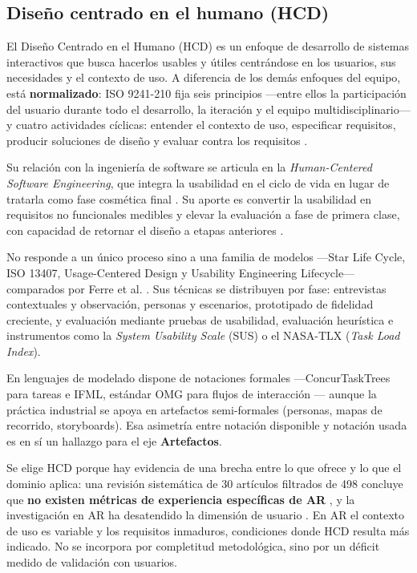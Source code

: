 \documentclass[conference]{IEEEtran}
\begin{document}
\subsection{Diseño centrado en el humano (HCD)}

El Diseño Centrado en el Humano (HCD) es un enfoque de desarrollo de sistemas interactivos que busca hacerlos usables y útiles centrándose en los usuarios, sus necesidades y el contexto de uso. A diferencia de los demás enfoques del equipo, está \textbf{normalizado}: ISO 9241-210 fija seis principios —entre ellos la participación del usuario durante todo el desarrollo, la iteración y el equipo multidisciplinario— y cuatro actividades cíclicas: entender el contexto de uso, especificar requisitos, producir soluciones de diseño y evaluar contra los requisitos \cite{ISO9241210}.

Su relación con la ingeniería de software se articula en la \textit{Human-Centered Software Engineering}, que integra la usabilidad en el ciclo de vida en lugar de tratarla como fase cosmética final \cite{Seffah2005}. Su aporte es convertir la usabilidad en requisitos no funcionales medibles y elevar la evaluación a fase de primera clase, con capacidad de retornar el diseño a etapas anteriores \cite{Ferre2005}.

No responde a un único proceso sino a una familia de modelos —Star Life Cycle, ISO 13407, Usage-Centered Design y Usability Engineering Lifecycle— comparados por Ferre et al. \cite{Ferre2005}. Sus técnicas se distribuyen por fase: entrevistas contextuales y observación, personas y escenarios, prototipado de fidelidad creciente, y evaluación mediante pruebas de usabilidad, evaluación heurística \cite{Nielsen1994} e instrumentos como la \textit{System Usability Scale} (SUS) o el NASA-TLX (\textit{Task Load Index}).

En lenguajes de modelado dispone de notaciones formales —ConcurTaskTrees para tareas \cite{Paterno2000} e IFML, estándar OMG para flujos de interacción \cite{OMG-IFML}— aunque la práctica industrial se apoya en artefactos semi-formales (personas, mapas de recorrido, storyboards). Esa asimetría entre notación disponible y notación usada es en sí un hallazgo para el eje \textbf{Artefactos}.

Se elige HCD porque hay evidencia de una brecha entre lo que ofrece y lo que el dominio aplica: una revisión sistemática de 30 artículos filtrados de 498 concluye que \textbf{no existen métricas de experiencia específicas de AR} \cite{Graser2024}, y la investigación en AR ha desatendido la dimensión de usuario \cite{Picardi2024}. En AR el contexto de uso es variable y los requisitos inmaduros, condiciones donde HCD resulta más indicado. No se incorpora por completitud metodológica, sino por un déficit medido de validación con usuarios.
\end{document}
